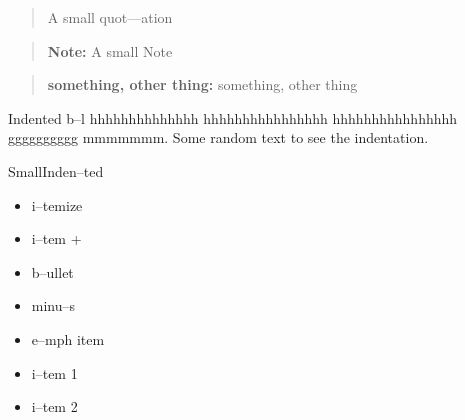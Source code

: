 \documentclass{book}
\newenvironment{Texinfoindented}{\begin{list}{}{}\item\relax}{\end{list}}
\renewcommand{\_}{\Texinfounderscore\discretionary{}{}{}}
\begin{document}
\begin{quote}
\begin{footnotesize}
A small quot---ation
\end{footnotesize}
\end{quote}

\begin{quote}
\begin{footnotesize}
\textbf{Note:} A small Note
\end{footnotesize}
\end{quote}

\begin{quote}
\begin{footnotesize}
\textbf{something, other thing:} something, other thing
\end{footnotesize}
\end{quote}

\begin{Texinfoindented}
Indented b--l hhhhhhhhhhhhhh hhhhhhhhhhhhhhhh hhhhhhhhhhhhhhhh gggggggggg
mmmmmmm.  Some random text to see the indentation.
\end{Texinfoindented}

\begin{Texinfoindented}
\begin{footnotesize}
SmallInden--ted
\end{footnotesize}
\end{Texinfoindented}

\begin{itemize}
\item i--temize
\end{itemize}

\begin{itemize}[label=+]
\item i--tem +
\end{itemize}

\begin{itemize}[label=\textbullet{}]
\item b--ullet
\end{itemize}

\begin{itemize}[label=-]
\item minu--s
\end{itemize}

\begin{itemize}[label=\emph{after emph}]
\item e--mph item
\end{itemize}

\begin{itemize}[label=\textbullet{} a--n itemize line]
\item {}%
i--tem 1
\item i--tem 2
\end{itemize}
\end{document}
